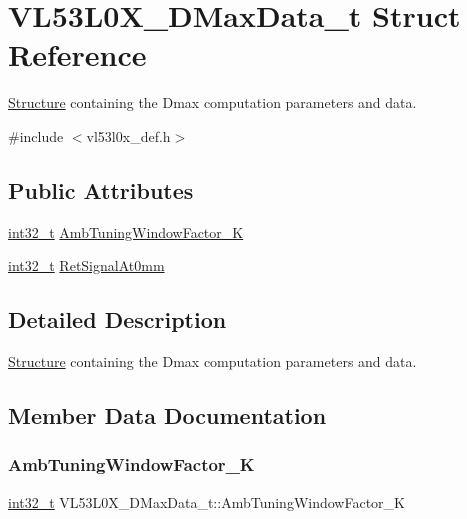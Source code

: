 \hypertarget{structVL53L0X__DMaxData__t}{}\section{V\+L53\+L0\+X\+\_\+\+D\+Max\+Data\+\_\+t Struct Reference}
\label{structVL53L0X__DMaxData__t}


\hyperlink{structStructure}{Structure} containing the Dmax computation parameters and data.  




{\ttfamily \#include $<$vl53l0x\+\_\+def.\+h$>$}

\subsection*{Public Attributes}
\begin{DoxyCompactItemize}
\item 
\hyperlink{vl53l0x__types_8h_a32f2e37ee053cf2ce8ca28d1f74630e5}{int32\+\_\+t} \hyperlink{structVL53L0X__DMaxData__t_a1618b8087f5f90030ea2474315078ac6}{Amb\+Tuning\+Window\+Factor\+\_\+K}
\item 
\hyperlink{vl53l0x__types_8h_a32f2e37ee053cf2ce8ca28d1f74630e5}{int32\+\_\+t} \hyperlink{structVL53L0X__DMaxData__t_aa796669242ee9360ec0b538d9b83678d}{Ret\+Signal\+At0mm}
\end{DoxyCompactItemize}


\subsection{Detailed Description}
\hyperlink{structStructure}{Structure} containing the Dmax computation parameters and data. 

\subsection{Member Data Documentation}
\mbox{\label{structVL53L0X__DMaxData__t_a1618b8087f5f90030ea2474315078ac6}} 
\subsubsection{\texorpdfstring{Amb\+Tuning\+Window\+Factor\+\_\+K}{AmbTuningWindowFactor\_K}}
{\footnotesize\ttfamily \hyperlink{vl53l0x__types_8h_a32f2e37ee053cf2ce8ca28d1f74630e5}{int32\+\_\+t} V\+L53\+L0\+X\+\_\+\+D\+Max\+Data\+\_\+t\+::\+Amb\+Tuning\+Window\+Factor\+\_\+K}


